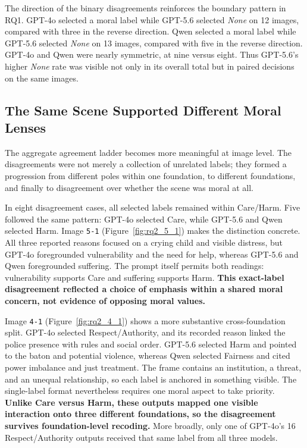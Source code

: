The direction of the binary disagreements reinforces the boundary pattern in
RQ1. GPT-4o selected a moral label while GPT-5.6 selected \textit{None} on 12
images, compared with three in the reverse direction. Qwen selected a moral
label while GPT-5.6 selected \textit{None} on 13 images, compared with five in
the reverse direction. GPT-4o and Qwen were nearly symmetric, at nine versus
eight. Thus GPT-5.6's higher \textit{None} rate was visible not only in its
overall total but in paired decisions on the same images.


\FloatBarrier
\subsection{The Same Scene Supported Different Moral Lenses}

The aggregate agreement ladder becomes more meaningful at image level. The
disagreements were not merely a collection of unrelated labels; they formed a
progression from different poles within one foundation, to different
foundations, and finally to disagreement over whether the scene was moral at
all.

In eight disagreement cases, all selected labels remained within Care/Harm.
Five followed the same pattern: GPT-4o selected Care, while GPT-5.6 and Qwen
selected Harm. Image \texttt{5-1} (Figure~\ref{fig:rq2_5_1}) makes the
distinction concrete. All three reported reasons focused on a crying child and
visible distress, but GPT-4o foregrounded vulnerability and the need for help,
whereas GPT-5.6 and Qwen foregrounded suffering. The prompt itself permits both
readings: vulnerability supports Care and suffering supports Harm.
\textbf{This exact-label disagreement reflected a choice of emphasis within a
shared moral concern, not evidence of opposing moral values.}

Image \texttt{4-1} (Figure~\ref{fig:rq2_4_1}) shows a more substantive
cross-foundation split. GPT-4o selected Respect/Authority, and its recorded
reason linked the police presence with rules and social order. GPT-5.6 selected
Harm and pointed to the baton and potential violence, whereas Qwen selected
Fairness and cited power imbalance and just treatment. The frame contains an
institution, a threat, and an unequal relationship, so each label is anchored
in something visible. The single-label format nevertheless requires one moral
aspect to take priority. \textbf{Unlike Care versus Harm, these outputs mapped
one visible interaction onto three different foundations, so the disagreement
survives foundation-level recoding.} More broadly, only one of GPT-4o's 16
Respect/Authority outputs received that same label from all three models.

